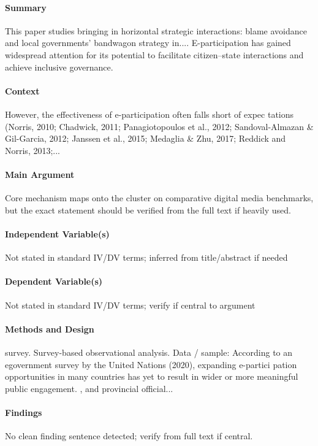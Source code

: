 \documentclass[12pt]{article}
\begin{document}
\paragraph{Summary} This paper studies bringing in horizontal strategic interactions: blame avoidance and local governments' bandwagon strategy in.... E-participation has gained widespread attention for its potential to facilitate citizen--state interactions and achieve inclusive governance.

\paragraph{Context} However, the effectiveness of e-participation often falls short of expec tations (Norris, 2010; Chadwick, 2011; Panagiotopoulos et al., 2012; Sandoval-Almazan \& Gil-Garcia, 2012; Janssen et al., 2015; Medaglia \& Zhu, 2017; Reddick and Norris, 2013;...

\paragraph{Main Argument} Core mechanism maps onto the cluster on comparative digital media benchmarks, but the exact statement should be verified from the full text if heavily used.

\paragraph{Independent Variable(s)} Not stated in standard IV/DV terms; inferred from title/abstract if needed

\paragraph{Dependent Variable(s)} Not stated in standard IV/DV terms; verify if central to argument

\paragraph{Methods and Design} survey. Survey-based observational analysis. Data / sample: According to an egovernment survey by the United Nations (2020), expanding e-partici pation opportunities in many countries has yet to result in wider or more meaningful public engagement. , and provincial official...

\paragraph{Findings} No clean finding sentence detected; verify from full text if central.
\end{document}
